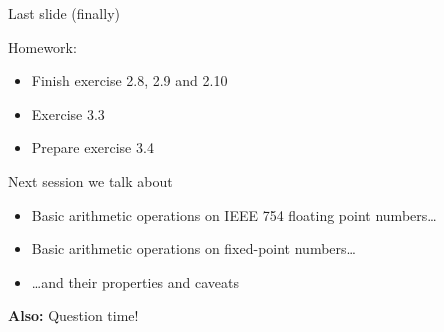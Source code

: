 \documentclass[11pt]{tudbeamer}
\begin{document}
\begin{frame}{Last slide (finally)}

	Homework:
	\begin{itemize}
		\item Finish exercise 2.8, 2.9 and 2.10
		\item Exercise 3.3
		\item Prepare exercise 3.4
	\end{itemize}
	\vspace{1em}
	
	Next session we talk about
	\begin{itemize}
		\item Basic arithmetic operations on IEEE 754 floating point numbers\dots
		\item Basic arithmetic operations on fixed-point numbers\dots
		\item \dots and their properties and caveats
	\end{itemize} 
	\vspace{1em}
	\textbf{Also:} Question time!

\end{frame}
\end{document}

